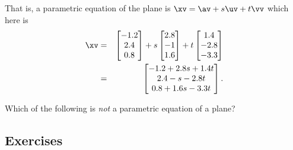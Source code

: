 \begin{example}
\begin{solution}
That is, a parametric equation of the plane is \(\xv=\av+s\uv+t\vv\) which here is
\begin{eqnarray*}
\xv&=&\begin{bmatrix} -1.2\\2.4\\0.8 \end{bmatrix}
+s\begin{bmatrix} 2.8\\-1\\1.6 \end{bmatrix}
+t\begin{bmatrix} 1.4\\-2.8\\-3.3 \end{bmatrix}
\\&=&\begin{bmatrix} -1.2+2.8s+1.4t\\2.4-s-2.8t\\0.8+1.6s-3.3t \end{bmatrix}.
\end{eqnarray*}
\end{solution}
\end{example}




\begin{activity}
Which of the following is \emph{not} a parametric equation of a plane?
\end{activity}











\subsection{Exercises}



